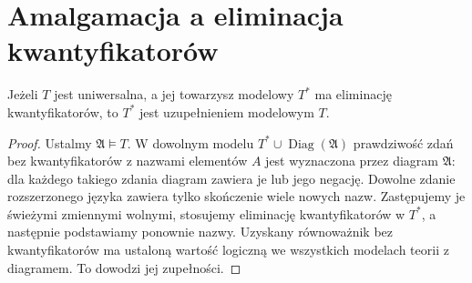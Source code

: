 \section{Amalgamacja a eliminacja kwantyfikatorów}
\begin{lemat}
\label{lem:mod-mc-qe-completion}
Jeżeli $T$ jest uniwersalna, a jej towarzysz
modelowy $T^*$ ma eliminację kwantyfikatorów,
to $T^*$ jest uzupełnieniem modelowym $T$.
\end{lemat}
\begin{proof}
Ustalmy $\mathfrak A\models T$.
W dowolnym modelu $T^*\cup\operatorname{Diag}(\mathfrak A)$
prawdziwość zdań bez kwantyfikatorów z nazwami elementów
$A$ jest wyznaczona przez diagram $\mathfrak A$:
dla każdego takiego zdania diagram zawiera je lub
jego negację.
Dowolne zdanie rozszerzonego języka zawiera tylko
skończenie wiele nowych nazw. Zastępujemy je
świeżymi zmiennymi wolnymi, stosujemy eliminację
kwantyfikatorów w $T^*$, a następnie podstawiamy
ponownie nazwy. Uzyskany równoważnik bez kwantyfikatorów
ma ustaloną wartość logiczną we wszystkich modelach
teorii z diagramem. To dowodzi jej zupełności.
\end{proof}

